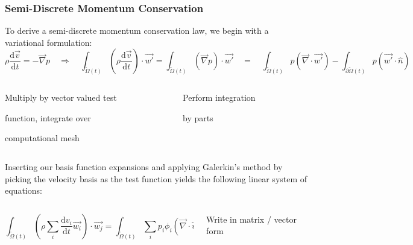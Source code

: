 \documentclass[8pt,xcolor=svgnames]{beamer}
\begin{document}
\begin{frame}
 \frametitle{Semi-Discrete Momentum Conservation}
 To derive a semi-discrete momentum conservation law, we begin with a variational formulation:
\[
 \rho \dfrac{\mathrm{d}\vec{v}}{\mathrm{d}t}=-\vec{\nabla} p \quad \Longrightarrow \quad
 \int_{\tilde{\Omega}(t)} \left(\rho\dfrac{\mathrm{d}\vec{v}}{\mathrm{d}t}\right)\cdot \vec{w'}
 =\int_{\tilde{\Omega}(t)} (\vec{\nabla} p) \cdot \vec{w'} \quad = \quad
 \int_{\tilde{\Omega}(t)} p(\vec{\nabla} \cdot \vec{w'}) - \int_{\partial \tilde{\Omega}(t)} p(\vec{w'} \cdot \hat{n}) 
\]
\vspace{-2ex}
\begin{columns}
\begin{column}{0.5\textwidth}
\hspace*{3ex}\parbox{30ex}{\centering \tiny{
Multiply by vector valued test

function, integrate over 

computational mesh}}
\end{column}
\begin{column}{0.5\textwidth}
\hspace*{-5ex}\parbox{30ex}{\centering \tiny{
Perform integration 

by parts
}}
\end{column}
\end{columns}
Inserting our basis function expansions and applying Galerkin’s method by picking the velocity basis
as the test function yields the following linear system of equations:
\begin{columns}
 \begin{column}{0.4\textwidth}
  \[
    \int_{\tilde{\Omega}(t)} \left(\rho\sum_i\frac{\mathrm{d}v_i}{\mathrm{d}t}\vec{w_i}\right)\cdot\vec{w_j}
    =\int_{\tilde{\Omega}(t)} \sum_ip_i\phi_i(\vec{\nabla}\cdot\vec{w_j})
  \]
 \end{column}
 \begin{column}{0.2\textwidth}
 \centering
 \tiny{Write in matrix / vector form}\smallskip
 

\end{column}
\end{columns}
\end{frame}
\end{document}
